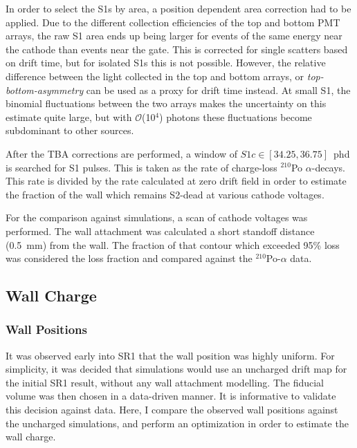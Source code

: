 In order to select the S1s by area, a position dependent area correction had to be applied.
Due to the different collection efficiencies of the top and bottom PMT arrays, the raw S1 area ends up being larger for events of the same energy near the cathode than events near the gate.
This is corrected for single scatters based on drift time, but for isolated S1s this is not possible. 
However, the relative difference between the light collected in the top and bottom arrays, or \textit{top-bottom-asymmetry} can be used as a proxy for drift time instead.
At small S1, the binomial fluctuations between the two arrays makes the uncertainty on this estimate quite large, but with $\mathcal{O}$(10$^4$) photons these fluctuations become subdominant to other sources.

After the TBA corrections are performed, a window of $S1c \in [34.25, 36.75]$~phd is searched for S1 pulses. 
This is taken as the rate of charge-loss $^{210}$Po $\alpha$-decays.
This rate is divided by the rate calculated at zero drift field in order to estimate the fraction of the wall which remains S2-dead at various cathode voltages.

For the comparison against simulations, a scan of cathode voltages was performed.
The wall attachment was calculated a short standoff distance (0.5~mm) from the wall. 
The fraction of that contour which exceeded 95\% loss was considered the loss fraction and compared against the $^{210}$Po-$\alpha$ data.



\subsection{Wall Charge}
\subsubsection{Wall Positions}
It  was observed early into SR1 that the wall position was highly uniform. 
For simplicity, it was decided that simulations would use an uncharged drift map for the initial SR1 result, without any wall attachment modelling.
The fiducial volume was then chosen in a data-driven manner.
It is informative to validate this decision against data.
Here, I compare the observed wall positions against the uncharged simulations, and perform an optimization in order to estimate the wall charge.

